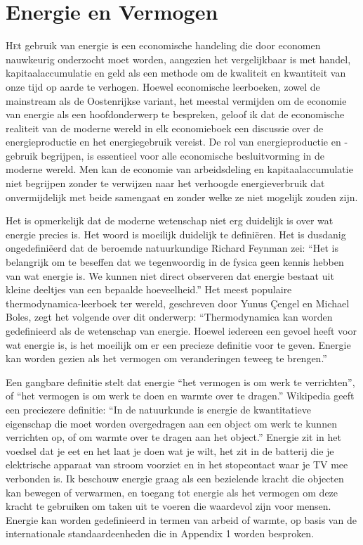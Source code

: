 \hypertarget{energie-en-vermogen}{%
\chapter{Energie en Vermogen}\label{energie-en-vermogen}}

\lettrine{H}et gebruik van energie is een economische handeling die door economen nauwkeurig onderzocht moet worden, aangezien het vergelijkbaar is met handel, kapitaalaccumulatie en geld als een methode om de kwaliteit en kwantiteit van onze tijd op aarde te verhogen. Hoewel economische leerboeken, zowel de mainstream als de Oostenrijkse variant, het meestal vermijden om de economie van energie als een hoofdonderwerp te bespreken, geloof ik dat de economische realiteit van de moderne wereld in elk economieboek een discussie over de energieproductie en het energiegebruik vereist. De rol van energieproductie en -gebruik begrijpen, is essentieel voor alle economische besluitvorming in de moderne wereld. Men kan de economie van arbeidsdeling en kapitaalaccumulatie niet begrijpen zonder te verwijzen naar het verhoogde energieverbruik dat onvermijdelijk met beide samengaat en zonder welke ze niet mogelijk zouden zijn.

Het is opmerkelijk dat de moderne wetenschap niet erg duidelijk is over wat energie precies is. Het woord is moeilijk duidelijk te definiëren. Het is dusdanig ongedefiniëerd dat de beroemde natuurkundige Richard Feynman zei: ``Het is belangrijk om te beseffen dat we tegenwoordig in de fysica geen kennis hebben van wat energie is. We kunnen niet direct observeren dat energie bestaat uit kleine deeltjes van een bepaalde hoeveelheid.'' \autocite{90} Het meest populaire thermodynamica-leerboek ter wereld, geschreven door Yunus Çengel en Michael Boles, zegt het volgende over dit onderwerp: ``Thermodynamica kan worden gedefinieerd als de wetenschap van energie. Hoewel iedereen een gevoel heeft voor wat energie is, is het moeilijk om er een precieze definitie voor te geven. Energie kan worden gezien als het vermogen om veranderingen teweeg te brengen.''\autocite{91}

Een gangbare definitie stelt dat energie ``het vermogen is om werk te verrichten'', of ``het vermogen is om werk te doen en warmte over te dragen.'' Wikipedia geeft een preciezere definitie: ``In de natuurkunde is energie de kwantitatieve eigenschap die moet worden overgedragen aan een object om werk te kunnen verrichten op, of om warmte over te dragen aan het object.'' Energie zit in het voedsel dat je eet en het laat je doen wat je wilt, het zit in de batterij die je elektrische apparaat van stroom voorziet en in het stopcontact waar je TV mee verbonden is. Ik beschouw energie graag als een bezielende kracht die objecten kan bewegen of verwarmen, en toegang tot energie als het vermogen om deze kracht te gebruiken om taken uit te voeren die waardevol zijn voor mensen. Energie kan worden gedefinieerd in termen van arbeid of warmte, op basis van de internationale standaardeenheden die in Appendix 1 worden besproken.

